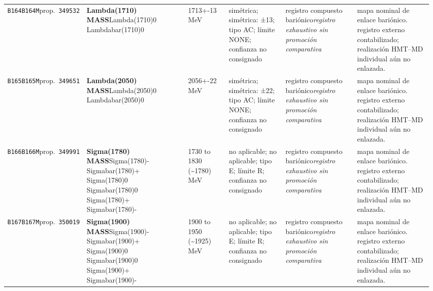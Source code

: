 \begin{landscape}
\begin{longtable}{L{1.85cm}L{4.45cm}L{2.35cm}L{4.05cm}L{3.35cm}L{7.15cm}}
\texttt{B164}\newline \texttt{B164M}\newline prop.\ \texttt{349532} & \textbf{Lambda(1710) MASS}\newline Lambda(1710)0 \textbar{}\allowbreak{} Lambdabar(1710)0 & 1713+-13\,MeV & simétrica; simétrica: ±13; tipo AC; límite NONE; confianza no consignado & registro compuesto bariónico\newline \emph{registro exhaustivo sin promoción comparativa} & mapa nominal de enlace bariónico. registro externo contabilizado; realización HMT--MD individual aún no enlazada. \\
\texttt{B165}\newline \texttt{B165M}\newline prop.\ \texttt{349651} & \textbf{Lambda(2050) MASS}\newline Lambda(2050)0 \textbar{}\allowbreak{} Lambdabar(2050)0 & 2056+-22\,MeV & simétrica; simétrica: ±22; tipo AC; límite NONE; confianza no consignado & registro compuesto bariónico\newline \emph{registro exhaustivo sin promoción comparativa} & mapa nominal de enlace bariónico. registro externo contabilizado; realización HMT--MD individual aún no enlazada. \\
\texttt{B166}\newline \texttt{B166M}\newline prop.\ \texttt{349991} & \textbf{Sigma(1780) MASS}\newline Sigma(1780)- \textbar{}\allowbreak{} Sigmabar(1780)+ \textbar{}\allowbreak{} Sigma(1780)0 \textbar{}\allowbreak{} Sigmabar(1780)0 \textbar{}\allowbreak{} Sigma(1780)+ \textbar{}\allowbreak{} Sigmabar(1780)- & 1730 to 1830 (\textasciitilde{}1780)\,MeV & no aplicable; no aplicable; tipo E; límite R; confianza no consignado & registro compuesto bariónico\newline \emph{registro exhaustivo sin promoción comparativa} & mapa nominal de enlace bariónico. registro externo contabilizado; realización HMT--MD individual aún no enlazada. \\
\texttt{B167}\newline \texttt{B167M}\newline prop.\ \texttt{350019} & \textbf{Sigma(1900) MASS}\newline Sigma(1900)- \textbar{}\allowbreak{} Sigmabar(1900)+ \textbar{}\allowbreak{} Sigma(1900)0 \textbar{}\allowbreak{} Sigmabar(1900)0 \textbar{}\allowbreak{} Sigma(1900)+ \textbar{}\allowbreak{} Sigmabar(1900)- & 1900 to 1950 (\textasciitilde{}1925)\,MeV & no aplicable; no aplicable; tipo E; límite R; confianza no consignado & registro compuesto bariónico\newline \emph{registro exhaustivo sin promoción comparativa} & mapa nominal de enlace bariónico. registro externo contabilizado; realización HMT--MD individual aún no enlazada. \\

\end{longtable}
\end{landscape}
